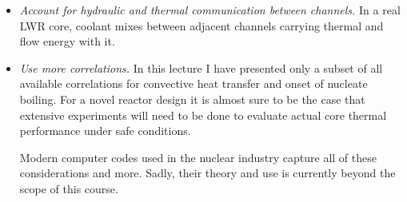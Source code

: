 \begin{itemize}
\item \emph{Account for hydraulic and thermal communication between channels.} In a real LWR core, coolant mixes between adjacent channels carrying thermal and flow energy with it.  

\item \emph{Use more correlations.}  In this lecture I have presented only a subset of all available correlations for convective heat transfer and onset of nucleate boiling.  For a novel reactor design it is almost sure to be the case that extensive experiments will need to be done to evaluate actual core thermal performance under safe conditions.

Modern computer codes used in the nuclear industry capture all of these considerations and more.  Sadly, their theory and use is currently beyond the scope of this course.
\end{itemize}
